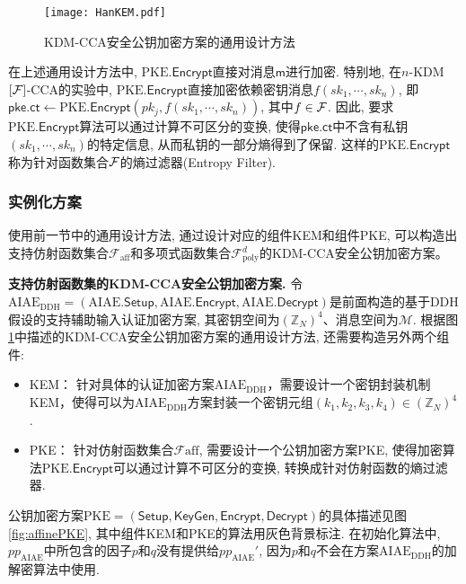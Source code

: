 \begin{figure}[h]
\centering
\vspace{5pt}
{\hspace{2pt}\texttt{[image: HanKEM.pdf]}}
\caption{KDM-CCA安全公钥加密方案的通用设计方法
}\label{fig:KDMCCA-frame}
\end{figure}

在上述通用设计方法中, $\text{PKE}.\mathsf{Encrypt}$直接对消息$\mathsf{m}$进行加密. 特别地, 在$n$-KDM$[\mathcal{F}]$-CCA的实验中, $\text{PKE}.\mathsf{Encrypt}$直接加密依赖密钥消息$f(sk_1, \cdots, sk_n)$, 即$\mathsf{pke.ct} \leftarrow  \text{PKE}.\mathsf{Encrypt}(pk_j, f(sk_1, \cdots, sk_n))$, 其中$f \in \mathcal{F}$. 因此, 要求$\text{PKE}.\mathsf{Encrypt}$算法可以通过计算不可区分的变换, 使得$\mathsf{pke.ct}$中不含有私钥$(sk_1, \cdots, sk_n)$的特定信息, 从而私钥的一部分熵得到了保留.
这样的$\text{PKE}.\mathsf{Encrypt}$称为针对函数集合$\mathcal{F}$的熵过滤器(Entropy Filter).





\subsubsection{实例化方案}
使用前一节中的通用设计方法, 通过设计对应的组件KEM和组件PKE, 可以构造出支持仿射函数集合$\mathcal{F}_{\text{aff}}$和多项式函数集合$\mathcal{F}_{\text{poly}}^d$的KDM-CCA安全公钥加密方案。

\medskip\noindent\textbf{支持仿射函数集的KDM-CCA安全公钥加密方案.} 令$\text{AIAE}_{\text{DDH}} = (\text{AIAE}.\mathsf{Setup}, \text{AIAE}.\mathsf{Encrypt}, \text{AIAE}.\mathsf{Decrypt})$是前面构造的基于DDH假设的支持辅助输入认证加密方案, 其密钥空间为$(\mathbb{Z}_N)^4$、消息空间为$\mathcal{M}$. 根据图\ref{fig:KDMCCA-frame}中描述的KDM-CCA安全公钥加密方案的通用设计方法, 还需要构造另外两个组件:
\begin{itemize}
\item KEM： 针对具体的认证加密方案$\text{AIAE}_{\text{DDH}}$，需要设计一个密钥封装机制KEM，使得可以为$\text{AIAE}_{\text{DDH}}$方案封装一个密钥元组$(k_1, k_2, k_3, k_4) \in (\mathbb{Z}_N)^4$.

\item PKE： 针对仿射函数集合$\mathcal{F}{\text{aff}}$, 需要设计一个公钥加密方案PKE, 使得加密算法$\text{PKE}.\mathsf{Encrypt}$可以通过计算不可区分的变换, 转换成针对仿射函数的熵过滤器. 
\end{itemize}

公钥加密方案$\text{PKE} = (\mathsf{Setup}, \mathsf{KeyGen}, \mathsf{Encrypt}, \mathsf{Decrypt})$的具体描述见图\ref{fig:affinePKE}, 其中组件KEM和PKE的算法用灰色背景标注. 在初始化算法中, $pp_{\text{AIAE}}$中所包含的因子$p$和$q$没有提供给$pp_{\text{AIAE}}'$, 因为$p$和$q$不会在方案$\text{AIAE}_{\text{DDH}}$的加解密算法中使用.



